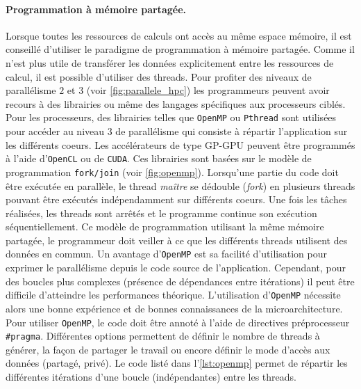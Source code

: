                
           
        \paragraph{Programmation à mémoire partagée.} \label{sec:prog_partagee}
            
            Lorsque toutes les ressources de calculs ont accès au même espace mémoire, il est conseillé d'utiliser le paradigme de programmation à mémoire partagée. Comme il n'est plus utile de transférer les données explicitement entre les ressources de calcul, il est possible d'utiliser des \glspl{thread}. Pour profiter des niveaux de parallélisme $2$ et $3$ (voir \autoref{fig:parallele_hpc}) les programmeurs peuvent avoir recours à des librairies ou même des langages spécifiques aux processeurs ciblés. Pour les processeurs, des librairies telles que \verb|OpenMP| ou \verb|Pthread| sont utilisées pour accéder au niveau $3$ de parallélisme qui consiste à répartir l'application sur les différents coeurs. Les accélérateurs de type GP-GPU peuvent être programmés à l'aide d'\verb|OpenCL| ou de \verb|CUDA|. Ces librairies sont basées sur le modèle de programmation \verb|fork/join| (voir \autoref{fig:openmp}). Lorsqu'une partie du code doit être exécutée en parallèle, le thread \textit{maître} se dédouble (\textit{fork}) en plusieurs threads pouvant être exécutés indépendamment sur différents coeurs. Une fois les tâches réalisées, les threads sont arrêtés et le programme continue son exécution séquentiellement. Ce modèle de programmation utilisant la même mémoire partagée, le programmeur doit veiller à ce que les différents threads utilisent des données en commun. Un avantage d'\verb|OpenMP| est sa facilité d'utilisation pour exprimer le parallélisme depuis le code source de l'application. Cependant, pour des boucles plus complexes (présence de dépendances entre itérations) il peut être difficile d'atteindre les performances théorique. L'utilisation d'\verb|OpenMP| nécessite alors une bonne expérience et de bonnes connaissances de la microarchitecture. Pour utiliser \verb|OpenMP|, le code doit être annoté à l'aide de directives préprocesseur \verb|#pragma|. Différentes options permettent de définir le nombre de threads à générer, la façon de partager le travail ou encore définir le mode d'accès aux données (partagé, privé). Le code listé dans l'\autoref{lst:openmp} permet de répartir les différentes itérations d'une boucle (indépendantes) entre les threads. 
            
